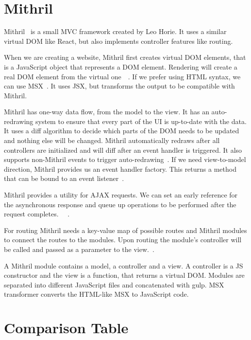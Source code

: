 \section{Mithril}

Mithril~\cite{Mithril} is a small MVC framework created by Leo Horie. It uses a similar virtual DOM like React, but also implements controller features like routing.

When we are creating a website, Mithril first creates virtual DOM elements, that is a JavaScript object that represents a DOM element. Rendering will create a real DOM element from the virtual one~\cite{Mithril-m}~\cite{Mithril-render}. If we prefer using HTML syntax, we can use MSX~\cite{MSX}. It uses JSX, but transforms the output to be compatible with Mithril. 

Mithril has one-way data flow, from the model to the view. It has an auto-redrawing system to ensure that every part of the UI is up-to-date with the data. It uses a diff algorithm to decide which parts of the DOM needs to be updated and nothing else will be changed. Mithril automatically redraws after all controllers are initialized and will diff after an event handler is triggered. It also supports non-Mithril events to trigger auto-redrawing~\cite{Mithril-redraw}. If we need view-to-model direction, Mithril provides us an event handler factory. This returns a method that can be bound to an event listener~\cite{Mithril-withAttr}.


Mithril provides a utility for AJAX requests. We can set an early reference for the asynchronous response and queue up operations to be performed after the request completes.  ~\cite{Mithril-webservice}~\cite{Mithril-request}.


For routing Mithril needs a key-value map of possible routes and Mithril modules to connect the routes to the modules. Upon routing the module's controller will be called and passed as a parameter to the view.~\cite{Mithril-routing}.

A Mithril module contains a model, a controller and a view. A controller is a JS constructor and the view is a function, that returns a virtual DOM. Modules are separated into different JavaScript files and concatenated with gulp. MSX transformer converts the HTML-like MSX to JavaScript code.

\newpage
\section{Comparison Table}

